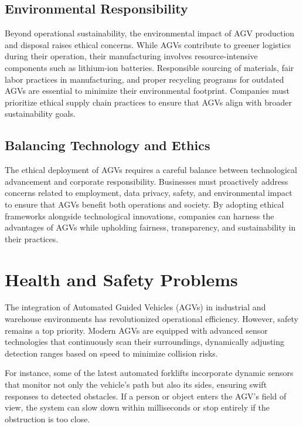 \documentclass[../../main]{subfiles}
\begin{document}
\subsection{Environmental Responsibility}

Beyond operational sustainability, 
the environmental impact of AGV production and disposal 
raises ethical concerns. 
While AGVs contribute to greener logistics during their operation, 
their manufacturing involves resource-intensive components 
such as lithium-ion batteries. 
Responsible sourcing of materials, 
fair labor practices in manufacturing, 
and proper recycling programs for outdated AGVs 
are essential to minimize their environmental footprint. 
Companies must prioritize ethical supply chain practices 
to ensure that AGVs align with broader sustainability goals.

\subsection{Balancing Technology and Ethics}

The ethical deployment of AGVs requires a careful balance 
between technological advancement and corporate responsibility. 
Businesses must proactively address concerns 
related to employment, data privacy, safety, 
and environmental impact 
to ensure that AGVs benefit both operations and society. 
By adopting ethical frameworks alongside technological innovations, 
companies can harness the advantages of AGVs 
while upholding fairness, transparency, 
and sustainability in their practices.


\section{Health and Safety Problems}

The integration of Automated Guided Vehicles (AGVs) in 
industrial and warehouse environments has revolutionized 
operational efficiency. However, safety remains a top 
priority. Modern AGVs are equipped with advanced sensor 
technologies that continuously scan their surroundings, 
dynamically adjusting detection ranges based on speed to 
minimize collision risks.

For instance, some of the latest automated forklifts 
incorporate dynamic sensors that monitor not only the 
vehicle’s path but also its sides, ensuring swift responses 
to detected obstacles. If a person or object enters the 
AGV’s field of view, the system can slow down within 
milliseconds or stop entirely if the obstruction is too close.
\end{document}
